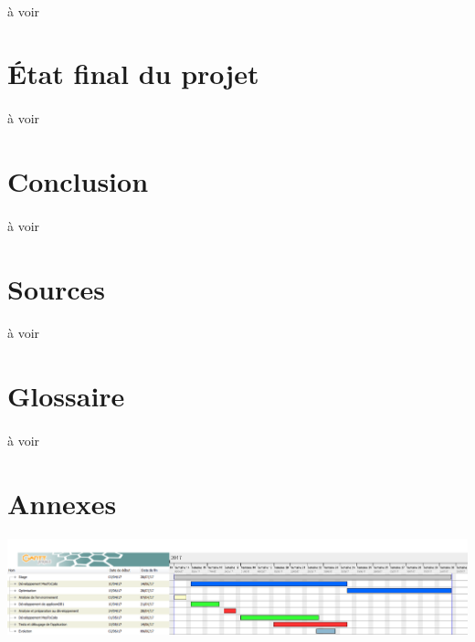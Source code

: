 \documentclass[a4paper,12pt]{extarticle}
\begin{document}
		\paragraph{}
			à voir\\
	\clearpage
	
	\section{État final du projet}
		\paragraph{}
			à voir\\
	\clearpage
	
	\section{Conclusion}
		\paragraph{}
			à voir\\
	\clearpage
	
	\section{Sources}
		\paragraph{}
			à voir\\
	
	\section{Glossaire}
		\paragraph{}
			à voir\\
	\clearpage
	
	\section{Annexes}
		\begin{center}	\centerline{\includegraphics[scale=0.35,angle=270]{DiagrammeDeGantt}}
		\end{center}
\end{document}
